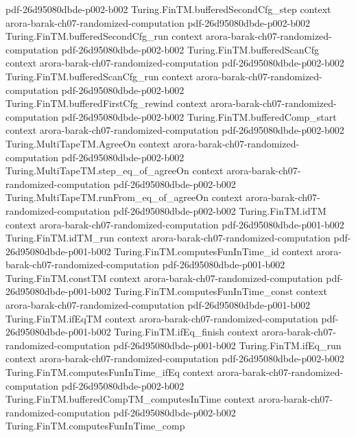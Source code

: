 \begin{theorem}
  {pdf-26d95080dbde-p002-b002}
\proofstep
  {Turing.FinTM.bufferedSecondCfg_step}
  {context}
  {arora-barak-ch07-randomized-computation}
  {pdf-26d95080dbde-p002-b002}
\proofstep
  {Turing.FinTM.bufferedSecondCfg_run}
  {context}
  {arora-barak-ch07-randomized-computation}
  {pdf-26d95080dbde-p002-b002}
\proofstep
  {Turing.FinTM.bufferedScanCfg}
  {context}
  {arora-barak-ch07-randomized-computation}
  {pdf-26d95080dbde-p002-b002}
\proofstep
  {Turing.FinTM.bufferedScanCfg_run}
  {context}
  {arora-barak-ch07-randomized-computation}
  {pdf-26d95080dbde-p002-b002}
\proofstep
  {Turing.FinTM.bufferedFirstCfg_rewind}
  {context}
  {arora-barak-ch07-randomized-computation}
  {pdf-26d95080dbde-p002-b002}
\proofstep
  {Turing.FinTM.bufferedComp_start}
  {context}
  {arora-barak-ch07-randomized-computation}
  {pdf-26d95080dbde-p002-b002}
\proofstep
  {Turing.MultiTapeTM.AgreeOn}
  {context}
  {arora-barak-ch07-randomized-computation}
  {pdf-26d95080dbde-p002-b002}
\proofstep
  {Turing.MultiTapeTM.step_eq_of_agreeOn}
  {context}
  {arora-barak-ch07-randomized-computation}
  {pdf-26d95080dbde-p002-b002}
\proofstep
  {Turing.MultiTapeTM.runFrom_eq_of_agreeOn}
  {context}
  {arora-barak-ch07-randomized-computation}
  {pdf-26d95080dbde-p002-b002}
\proofstep
  {Turing.FinTM.idTM}
  {context}
  {arora-barak-ch07-randomized-computation}
  {pdf-26d95080dbde-p001-b002}
\proofstep
  {Turing.FinTM.idTM_run}
  {context}
  {arora-barak-ch07-randomized-computation}
  {pdf-26d95080dbde-p001-b002}
\proofstep
  {Turing.FinTM.computesFunInTime_id}
  {context}
  {arora-barak-ch07-randomized-computation}
  {pdf-26d95080dbde-p001-b002}
\proofstep
  {Turing.FinTM.constTM}
  {context}
  {arora-barak-ch07-randomized-computation}
  {pdf-26d95080dbde-p001-b002}
\proofstep
  {Turing.FinTM.computesFunInTime_const}
  {context}
  {arora-barak-ch07-randomized-computation}
  {pdf-26d95080dbde-p001-b002}
\proofstep
  {Turing.FinTM.ifEqTM}
  {context}
  {arora-barak-ch07-randomized-computation}
  {pdf-26d95080dbde-p001-b002}
\proofstep
  {Turing.FinTM.ifEq_finish}
  {context}
  {arora-barak-ch07-randomized-computation}
  {pdf-26d95080dbde-p001-b002}
\proofstep
  {Turing.FinTM.ifEq_run}
  {context}
  {arora-barak-ch07-randomized-computation}
  {pdf-26d95080dbde-p002-b002}
\proofstep
  {Turing.FinTM.computesFunInTime_ifEq}
  {context}
  {arora-barak-ch07-randomized-computation}
  {pdf-26d95080dbde-p002-b002}
\proofstep
  {Turing.FinTM.bufferedCompTM_computesInTime}
  {context}
  {arora-barak-ch07-randomized-computation}
  {pdf-26d95080dbde-p002-b002}
\proofstep
  {Turing.FinTM.computesFunInTime_comp}

\end{theorem}
